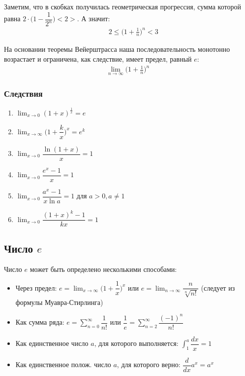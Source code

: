 \documentclass[12pt, fleqn]{extarticle}
\begin{document}
Заметим, что в скобках получилась геометрическая прогрессия, сумма которой равна \(2 \cdot \Big(1 - \dfrac{1}{2^n}\Big) < 2>\). А значит:
\begin{align*}
     &  &
    2 \leq \Big(1 + \frac{1}{n}\Big)^n < 3
\end{align*}

На основании теоремы Вейерштрасса наша последовательность монотонно возрастает и ограничена, как следствие, имеет предел, равный \(e\):
\begin{align*}
    \lim_{n \to \infty}{\Big(1 + \frac{1}{n}\Big)^n}
\end{align*}


\subsubsection*{Следствия}
\begin{enumerate}
    \item {\(\displaystyle{\lim_{x \to 0}{(1 + x)^{\frac{1}{x}}} = e}\)}
    \item {\(\displaystyle{\lim_{x \to \infty}{\Big(1 + \dfrac{k}{x}\Big)^x} = e^k}\)}
    \item {\(\displaystyle{\lim_{x \to 0}{\dfrac{\ln{(1 + x)}}{x}} = 1}\)}
    \item {\(\displaystyle{\lim_{x \to 0}{\dfrac{e^x - 1}{x}} = 1}\)}
    \item {\(\displaystyle{\lim_{x \to 0}{\dfrac{a^x - 1}{x\ln{a}} = 1}}\) для \(a > 0, a \neq 1\)}
    \item {\(\displaystyle{\lim_{x \to 0}{\dfrac{(1 + x)^k - 1}{kx}} = 1}\)}
\end{enumerate}

\subsection*{Число \(e\)}
Число \(e\) может быть определено несколькими способами:
\begin{itemize}
    \item {Через предел: \(e = \lim_{x \to \infty}{\Big(1 + \dfrac{1}{x}\Big)^x}\) или \(e = \lim_{n \to \infty}{\dfrac{n}{\sqrt[n]{n!}}}\) (следует из формулы Муавра-Стирлинга)}

    \item {Как сумма ряда: \(e = \displaystyle{\sum_{n = 0}^{\infty}{\dfrac{1}{n!}}}\) или \(\dfrac{1}{e} = \displaystyle{\sum_{n = 2}^{\infty}{\dfrac{(-1)^n}{n!}}}\) }

    \item {Как единственное число \(a\), для которого выполняется: \(\displaystyle{\int_{1}^{a}{\dfrac{dx}{x}} = 1}\)}

    \item {Как единственное полож. число \(a\), для которого верно: \(\dfrac{d}{dx}a^x = a^x\)}
\end{itemize}
\end{document}
